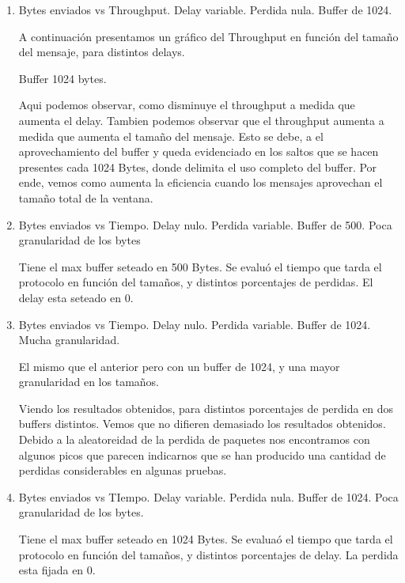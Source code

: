 \begin{enumerate}
\item Bytes enviados vs Throughput. Delay variable. Perdida nula. Buffer de 1024. 

  A continuaci\'on presentamos un gr\'afico del Throughput en funci\'on del tama\~no del mensaje, para distintos delays.

  Buffer 1024 bytes.

  Aqui podemos observar, como disminuye el throughput a medida que aumenta el delay. Tambien podemos observar que el throughput aumenta a medida que aumenta el tama\~no del mensaje. Esto se debe, a el aprovechamiento del buffer y queda evidenciado en los saltos que se hacen presentes cada 1024 Bytes, donde delimita el uso completo del buffer.
  Por ende, vemos como aumenta la eficiencia cuando los mensajes aprovechan el tama\~no total de la ventana.


\item Bytes enviados vs Tiempo. Delay nulo. Perdida variable. Buffer de 500. Poca granularidad de los bytes

  Tiene el max buffer seteado en 500 Bytes. Se evalu\'o el tiempo que tarda el protocolo en funci\'on del tama\~nos, y distintos porcentajes de perdidas. El delay esta seteado en 0. 

\item Bytes enviados vs Tiempo. Delay nulo. Perdida variable. Buffer de 1024. Mucha granularidad.  

  El mismo que el anterior pero con un buffer de 1024, y una mayor granularidad en los tama\~nos.

  Viendo los resultados obtenidos, para distintos porcentajes de perdida en dos buffers distintos. Vemos que no difieren demasiado los resultados obtenidos. Debido a la aleatoreidad de la perdida de paquetes nos encontramos con algunos picos que parecen indicarnos que se han producido una cantidad de perdidas considerables en algunas pruebas. 

\item Bytes enviados vs TIempo. Delay variable. Perdida nula. Buffer de 1024. Poca granularidad de los bytes.

  Tiene el max buffer seteado en 1024 Bytes. Se evalua\'o el tiempo que tarda el protocolo en funci\'on del tama\~nos, y distintos porcentajes de delay. La perdida esta fijada en 0. 


\end{enumerate}
